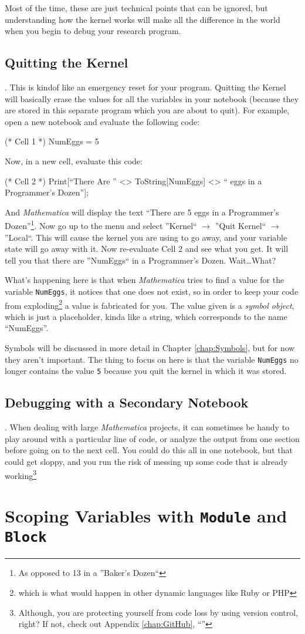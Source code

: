 Most of the time, these are just technical points that can be ignored, but understanding how the kernel works will make all the difference in the world when you begin to debug your research program.

\subsection{Quitting the Kernel}. This is kindof like an emergency reset for your program. Quitting the Kernel will basically erase the values for all the variables in your notebook (because they are stored in this separate program which you are about to quit). For example, open a new notebook and evaluate the following code:

\begin{code}
	   (* Cell 1 *)
	   NumEggs = 5
\end{code}

Now, in a new cell, evaluate this code:

\begin{code}
	(* Cell 2 *)
	Print[``There Are '' <> ToString[NumEggs] <> `` eggs in a Programmer's Dozen''];
\end{code}

And \emph{Mathematica} will display the text ``There are 5 eggs in a Programmer's Dozen''\footnote{As opposed to 13 in a ''Baker's Dozen``}. Now go up to the menu and select ''Kernel`` $\rightarrow$ ''Quit Kernel`` $\rightarrow$ ''Local``. This will cause the kernel you are using to go away, and your variable state will go away with it. Now re-evaluate Cell 2 and see what you get. It will tell you that there are ''NumEggs`` in a Programmer's Dozen. Wait\ldots What?

What's happening here is that when \emph{Mathematica} tries to find a value for the variable \texttt{NumEggs}, it notices that one does not exist, so in order to keep your code from exploding\footnote{which is what would happen in other dynamic languages like Ruby or PHP} a value is fabricated for you. The value given is a \emph{symbol object}, which is just a placeholder, kinda like a string, which corresponds to the name ``NumEggs''.

Symbols will be discussed in more detail in Chapter \ref{chap:Symbols}, but for now they aren't important. The thing to focus on here is that the variable \texttt{NumEggs} no longer contains the value \texttt{5} because you quit the kernel in which it was stored.

\subsection{Debugging with a Secondary Notebook}. When dealing with large \emph{Mathematica} projects, it can sometimes be handy to play around with a particular line of code, or analyze the output from one section before going on to the next cell. You could do this all in one notebook, but that could get sloppy, and you run the risk of messing up some code that is already working\footnote{Although, you are protecting yourself from code loss by using version control, right? If not, check out Appendix \ref{chap:GitHub}, ``''}

\section{Scoping Variables with \texttt{Module} and \texttt{Block}}
